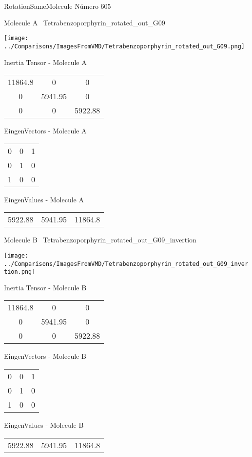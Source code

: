 \vtab[-3cm]
\begin{center}
{\large RotationSameMolecule \tab Número 605}
\end{center}
\begin{multicols}{2}
\begin{center}

Molecule A \
Tetrabenzoporphyrin\_rotated\_out\_G09

\texttt{[image: ../Comparisons/ImagesFromVMD/Tetrabenzoporphyrin\_rotated\_out\_G09.png]}

Inertia Tensor - Molecule A \\
\begin{tabular}{|c c c|}
11864.8	 & 	0	 & 	0	 \\
0	 & 	5941.95	 & 	0	 \\
0	 & 	0	 & 	5922.88
\end{tabular}

\vtab
 EingenVectors - Molecule A     \\
\begin{tabular}{|c c c|}
0	 & 	0	 & 	1	 \\
0	 & 	1	 & 	0	 \\
1	 & 	0	 & 	0
\end{tabular}

\vtab
 EingenValues - Molecule A     \\
\begin{tabular}{|c c c|}
5922.88	 & 	5941.95	 & 	11864.8	 \\
\end{tabular}
\columnbreak

Molecule B \
Tetrabenzoporphyrin\_rotated\_out\_G09\_invertion

\texttt{[image: ../Comparisons/ImagesFromVMD/Tetrabenzoporphyrin\_rotated\_out\_G09\_invertion.png]}

Inertia Tensor - Molecule B \\
\begin{tabular}{|c c c|}
11864.8	 & 	0	 & 	0	 \\
0	 & 	5941.95	 & 	0	 \\
0	 & 	0	 & 	5922.88
\end{tabular}

\vtab
 EingenVectors - Molecule B     \\
\begin{tabular}{|c c c|}
0	 & 	0	 & 	1	 \\
0	 & 	1	 & 	0	 \\
1	 & 	0	 & 	0
\end{tabular}

\vtab
 EingenValues - Molecule B     \\
\begin{tabular}{|c c c|}
5922.88	 & 	5941.95	 & 	11864.8	 \\
\end{tabular}

\end{center}
\end{multicols}

